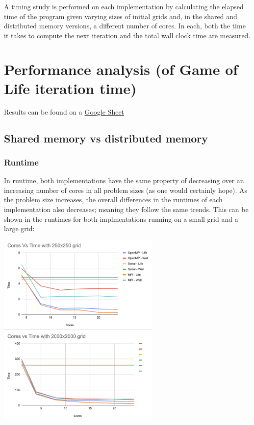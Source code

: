 \documentclass[11pt]{article}
\begin{document}
A timing study is performed on each implementation by calculating the elapsed time of the program given varying sizes of initial grids and, in the shared and distributed memory versions, a different number of cores. In each, both the time it takes to compute the next iteration and the total wall clock time are measured.

\section{Performance analysis (of Game of Life iteration time)}
\label{sec:org1f7f2b6}
Results can be found on a \href{https://docs.google.com/spreadsheets/d/1QxCsyMFzk67Qpuv-xZ-tRny4jHMebXTrdq5ncc7C4Tw/edit?usp=sharing}{Google Sheet}
\subsection{Shared memory vs distributed memory}
\label{sec:org9f5d8c9}
\subsubsection{Runtime}
\label{sec:org9209384}
In runtime, both implementations have the same property of decreasing over an increasing number of cores in all problem sizes (as one would certainly hope). As the problem size increases, the overall differences in the runtimes of each implementation also decreases; meaning they follow the same trends. This can be shown in the runtimes for both implmentations running on a small grid and a large grid:

\begin{center}
\includegraphics[width=8cm]{./cores-vs-runtimes.png}
\end{center}
\end{document}
